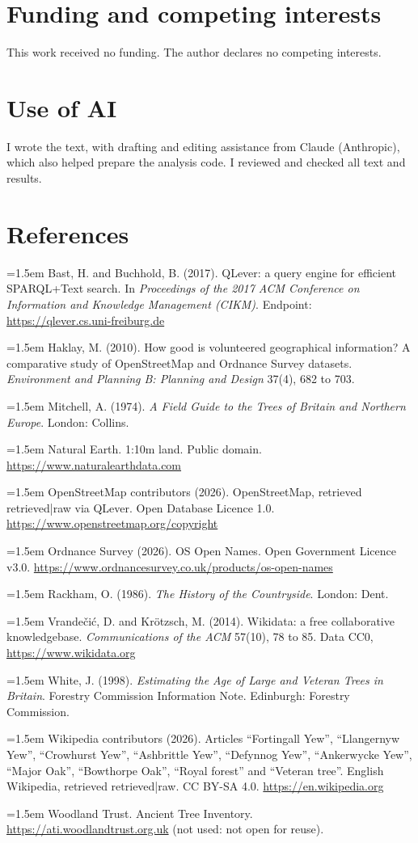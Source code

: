 \documentclass[11pt,a4paper]{article}
\begin{document}
\section*{Funding and competing interests}

This work received no funding. The author declares no competing interests.

\section*{Use of AI}

I wrote the text, with drafting and editing assistance from Claude (Anthropic), which also helped prepare the analysis code. I reviewed and checked all text and results.

\section*{References}
\small
\setlength{\parskip}{0.35em}
\hangindent=1.5em Bast, H. and Buchhold, B. (2017). QLever: a query engine for efficient SPARQL+Text search. In \textit{Proceedings of the 2017 ACM Conference on Information and Knowledge Management (CIKM)}. Endpoint: \url{https://qlever.cs.uni-freiburg.de}

\hangindent=1.5em Haklay, M. (2010). How good is volunteered geographical information? A comparative study of OpenStreetMap and Ordnance Survey datasets. \textit{Environment and Planning B: Planning and Design} 37(4), 682 to 703.

\hangindent=1.5em Mitchell, A. (1974). \textit{A Field Guide to the Trees of Britain and Northern Europe}. London: Collins.

\hangindent=1.5em Natural Earth. 1:10m land. Public domain. \url{https://www.naturalearthdata.com}

\hangindent=1.5em OpenStreetMap contributors (2026). OpenStreetMap, retrieved {{retrieved|raw}} via QLever. Open Database Licence 1.0. \url{https://www.openstreetmap.org/copyright}

\hangindent=1.5em Ordnance Survey (2026). OS Open Names. Open Government Licence v3.0. \url{https://www.ordnancesurvey.co.uk/products/os-open-names}

\hangindent=1.5em Rackham, O. (1986). \textit{The History of the Countryside}. London: Dent.

\hangindent=1.5em Vrandečić, D. and Krötzsch, M. (2014). Wikidata: a free collaborative knowledgebase. \textit{Communications of the ACM} 57(10), 78 to 85. Data CC0, \url{https://www.wikidata.org}

\hangindent=1.5em White, J. (1998). \textit{Estimating the Age of Large and Veteran Trees in Britain}. Forestry Commission Information Note. Edinburgh: Forestry Commission.

\hangindent=1.5em Wikipedia contributors (2026). Articles ``Fortingall Yew'', ``Llangernyw Yew'', ``Crowhurst Yew'', ``Ashbrittle Yew'', ``Defynnog Yew'', ``Ankerwycke Yew'', ``Major Oak'', ``Bowthorpe Oak'', ``Royal forest'' and ``Veteran tree''. English Wikipedia, retrieved {{retrieved|raw}}. CC BY-SA 4.0. \url{https://en.wikipedia.org}

\hangindent=1.5em Woodland Trust. Ancient Tree Inventory. \url{https://ati.woodlandtrust.org.uk} (not used: not open for reuse).
\end{document}
